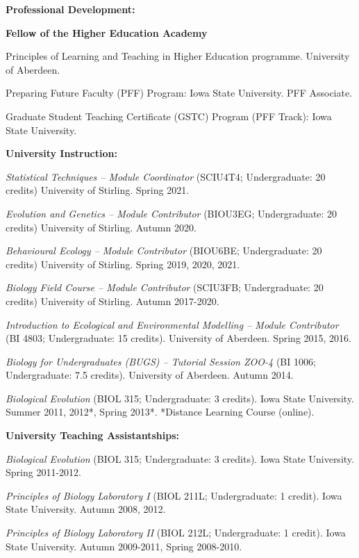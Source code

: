 \documentclass[letterpaper]{article}
\renewenvironment{itemize}{
  \begin{list}{}{
    \setlength{\leftmargin}{1.5em}
  }
}{
  \end{list}
}
\begin{document}
\begin{itemize}
\item {\bf Professional Development:}
\begin{itemize}
\item[$\bullet$]{{\bf Fellow of the Higher Education Academy}}
\item[$\bullet$]{Principles of Learning and Teaching in Higher Education programme. University of Aberdeen.}
\item[$\bullet$]{Preparing Future Faculty (PFF) Program: Iowa State University. PFF Associate.}
\item[$\bullet$]{Graduate Student Teaching Certificate (GSTC) Program (PFF Track): Iowa State University.}
\end{itemize}

\item {\bf University Instruction:}
\begin{itemize}
\item[$\bullet$]{{\it Statistical Techniques -- Module Coordinator} (SCIU4T4; Undergraduate: 20 credits) University of Stirling. Spring 2021.}
\item[$\bullet$]{{\it Evolution and Genetics -- Module Contributor} (BIOU3EG; Undergraduate: 20 credits) University of Stirling. Autumn 2020.}
\item[$\bullet$]{{\it Behavioural Ecology -- Module Contributor} (BIOU6BE; Undergraduate: 20 credits) University of Stirling. Spring 2019, 2020, 2021.}
\item[$\bullet$]{{\it Biology Field Course -- Module Contributor} (SCIU3FB; Undergraduate: 20 credits) University of Stirling. Autumn 2017-2020.}
\item[$\bullet$]{{\it Introduction to Ecological and Environmental Modelling -- Module Contributor} (BI 4803; Undergraduate: 15 credits). University of Aberdeen. Spring 2015, 2016.}
\item[$\bullet$]{{\it Biology for Undergraduates (BUGS) -- Tutorial Session ZOO-4} (BI 1006; Undergraduate: 7.5 credits). University of Aberdeen. Autumn 2014.}
\item[$\bullet$]{{\it Biological Evolution} (BIOL 315; Undergraduate: 3 credits). Iowa State University. Summer 2011, 2012*, Spring 2013*. *Distance Learning Course (online).}
\end{itemize}

\item {\bf University Teaching Assistantships:}
\begin{itemize}
\item[$\bullet$]{{\it Biological Evolution} (BIOL 315; Undergraduate: 3 credits). Iowa State University. Spring 2011-2012.}
\item[$\bullet$]{{\it Principles of Biology Laboratory I} (BIOL 211L; Undergraduate: 1 credit). Iowa State University. Autumn 2008, 2012.}
\item[$\bullet$]{{\it Principles of Biology Laboratory II} (BIOL 212L; Undergraduate: 1 credit). Iowa State University. Autumn 2009-2011, Spring 2008-2010.}
\end{itemize}


\end{itemize}
\end{document}
